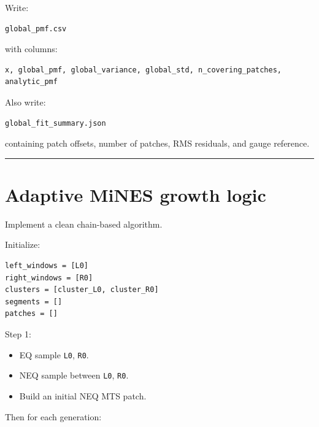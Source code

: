 \documentclass[
  10.5pt,
]{article}
\newcommand{\passthrough}[1]{#1}
\providecommand{\tightlist}{%
  \setlength{\itemsep}{0pt}\setlength{\parskip}{0pt}}
\begin{document}
Write:

\begin{lstlisting}
global_pmf.csv
\end{lstlisting}

with columns:

\begin{lstlisting}
x, global_pmf, global_variance, global_std, n_covering_patches, analytic_pmf
\end{lstlisting}

Also write:

\begin{lstlisting}
global_fit_summary.json
\end{lstlisting}

containing patch offsets, number of patches, RMS residuals, and gauge
reference.

\begin{center}\rule{0.5\linewidth}{0.5pt}\end{center}

\section{Adaptive MiNES growth logic}\label{adaptive-mines-growth-logic}

Implement a clean chain-based algorithm.

Initialize:

\begin{lstlisting}
left_windows = [L0]
right_windows = [R0]
clusters = [cluster_L0, cluster_R0]
segments = []
patches = []
\end{lstlisting}

Step 1:

\begin{itemize}
\tightlist
\item
  EQ sample \passthrough{\lstinline!L0!}, \passthrough{\lstinline!R0!}.
\item
  NEQ sample between \passthrough{\lstinline!L0!},
  \passthrough{\lstinline!R0!}.
\item
  Build an initial NEQ MTS patch.
\end{itemize}

Then for each generation:
\end{document}
